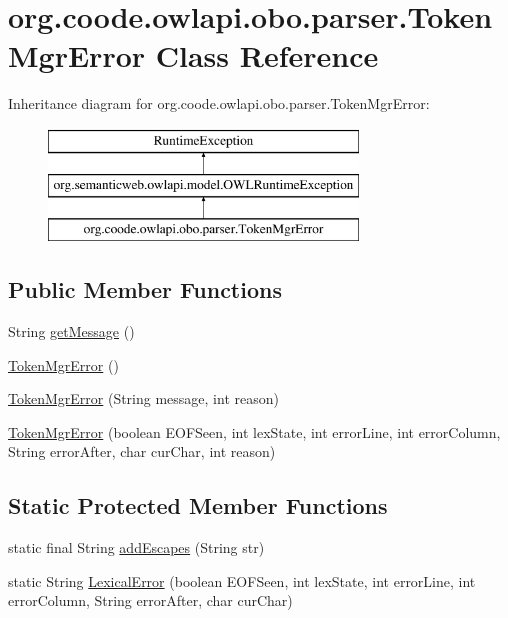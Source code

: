 \hypertarget{classorg_1_1coode_1_1owlapi_1_1obo_1_1parser_1_1_token_mgr_error}{\section{org.\-coode.\-owlapi.\-obo.\-parser.\-Token\-Mgr\-Error Class Reference}
\label{classorg_1_1coode_1_1owlapi_1_1obo_1_1parser_1_1_token_mgr_error}
}
Inheritance diagram for org.\-coode.\-owlapi.\-obo.\-parser.\-Token\-Mgr\-Error\-:\begin{figure}[H]
\begin{center}
\leavevmode
\includegraphics[height=3.000000cm]{classorg_1_1coode_1_1owlapi_1_1obo_1_1parser_1_1_token_mgr_error}
\end{center}
\end{figure}
\subsection*{Public Member Functions}
\begin{DoxyCompactItemize}
\item 
String \hyperlink{classorg_1_1coode_1_1owlapi_1_1obo_1_1parser_1_1_token_mgr_error_a0b2746cf6b9c5a3cca049042a7a2dd5b}{get\-Message} ()
\item 
\hyperlink{classorg_1_1coode_1_1owlapi_1_1obo_1_1parser_1_1_token_mgr_error_a600a0bb79a790fae63b5e67f8ade993d}{Token\-Mgr\-Error} ()
\item 
\hyperlink{classorg_1_1coode_1_1owlapi_1_1obo_1_1parser_1_1_token_mgr_error_a3a70c2bc3a06d1db60eec8cf30ece315}{Token\-Mgr\-Error} (String message, int reason)
\item 
\hyperlink{classorg_1_1coode_1_1owlapi_1_1obo_1_1parser_1_1_token_mgr_error_aa9b1a2f87d37eb5b499fd64eb3b78229}{Token\-Mgr\-Error} (boolean E\-O\-F\-Seen, int lex\-State, int error\-Line, int error\-Column, String error\-After, char cur\-Char, int reason)
\end{DoxyCompactItemize}
\subsection*{Static Protected Member Functions}
\begin{DoxyCompactItemize}
\item 
static final String \hyperlink{classorg_1_1coode_1_1owlapi_1_1obo_1_1parser_1_1_token_mgr_error_a6e75662d87911fb2882c855b15e08df8}{add\-Escapes} (String str)
\item 
static String \hyperlink{classorg_1_1coode_1_1owlapi_1_1obo_1_1parser_1_1_token_mgr_error_aae1b3f6ca3804c28fb35b52a5e476857}{Lexical\-Error} (boolean E\-O\-F\-Seen, int lex\-State, int error\-Line, int error\-Column, String error\-After, char cur\-Char)
\end{DoxyCompactItemize}
